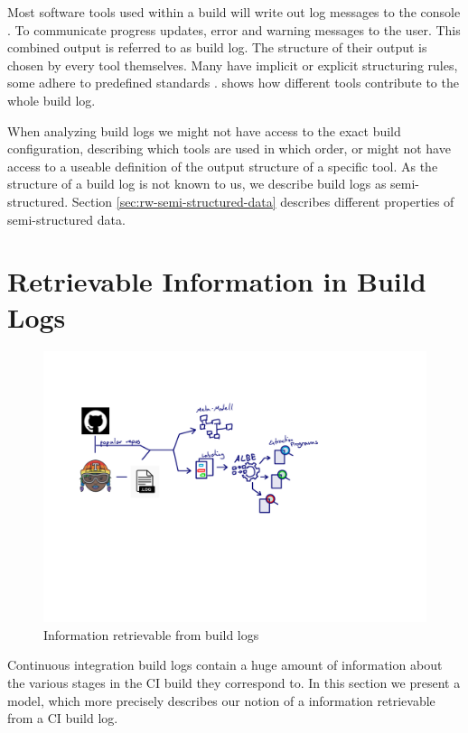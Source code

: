 \documentclass[\myrootdir/main.tex]{subfiles}
\begin{document}
Most software tools used within a build will write out log messages to the console .
To communicate progress updates, error and warning messages to the user.
This combined output is referred to as build log.
The structure of their output is chosen by every tool themselves.
Many have implicit or explicit structuring rules, some adhere to predefined standards .
 shows how different tools contribute to the whole build log.

When analyzing build logs we might not have access to the exact build configuration, describing which tools are used in which order, or might not have access to a useable definition of the output structure of a specific tool.
As the structure of a build log is not known to us, we describe build logs as semi-structured. Section \ref{sec:rw-semi-structured-data} describes different properties of semi-structured data.

\section{Retrievable Information in Build Logs}
\begin{figure}[h]
  \centering
\includegraphics[page=2, width=\textwidth, trim={0.5cm 0.5cm 0.5cm 0.5cm}, clip]{img/flow-of-research.pdf}
  \caption{Information retrievable from build logs}
  \label{fig:build-log-information-draft}
\end{figure}
Continuous integration build logs contain a huge amount of information about the various stages in the CI build they correspond to.
In this section we present a model, which more precisely describes our notion of a information retrievable from a CI build log.
\end{document}
